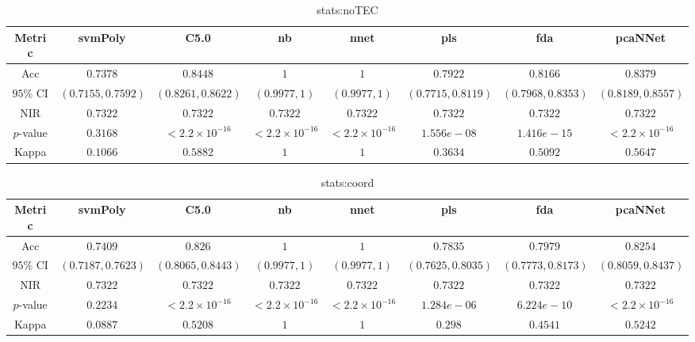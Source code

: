 \begin{table}[!ht]
	\centering
	\begin{tabular}{|c|c|c|c|c|c|c|c|}
		\hline
		Metric & svmPoly & C5.0 & nb & nnet & pls & fda & pcaNNet \\ \hline
		Acc & $0.7378$ & $0.8448$ & $1$ & $1$ & $0.7922$ & $0.8166$ & $0.8379$ \\ \hline
		$95\%$ CI & $(0.7155, 0.7592)$ & $(0.8261, 0.8622)$ & $(0.9977, 1)$ & $(0.9977, 1)$ & $(0.7715, 0.8119)$ & $(0.7968, 0.8353)$ & $(0.8189, 0.8557)$ \\ \hline
		NIR & $0.7322$ & $0.7322$ & $0.7322$ & $0.7322$ & $0.7322$ & $0.7322$ & $0.7322$ \\ \hline
		$p$-value & $0.3168$ & $< 2.2 \times {10}^{-16}$ & $< 2.2 \times {10}^{-16}$ & $< 2.2 \times {10}^{-16}$ & $1.556e-08$ & $1.416e-15$ & $< 2.2 \times {10}^{-16}$ \\ \hline
		Kappa & $0.1066$ & $0.5882$ & $1$ & $1$ & $0.3634$ & $0.5092$ & $0.5647$ \\ \hline
	\end{tabular}
	\caption{stats:noTEC}
	\label{tab:stats:noTEC}
\end{table}

\begin{table}[!ht]
	\centering
	\begin{tabular}{|c|c|c|c|c|c|c|c|}
		\hline
		Metric & svmPoly & C5.0 & nb & nnet & pls & fda & pcaNNet \\ \hline
		Acc & $0.7409$ & $0.826$ & $1$ & $1$ & $0.7835$ & $0.7979$ & $0.8254$ \\ \hline
		$95\%$ CI & $(0.7187, 0.7623)$ & $(0.8065, 0.8443)$ & $(0.9977, 1)$ & $(0.9977, 1)$ & $(0.7625, 0.8035)$ & $(0.7773, 0.8173)$ & $(0.8059, 0.8437)$ \\ \hline
		NIR & $0.7322$ & $0.7322$ & $0.7322$ & $0.7322$ & $0.7322$ & $0.7322$ & $0.7322$ \\ \hline
		$p$-value & $0.2234$ & $< 2.2 \times {10}^{-16}$ & $< 2.2 \times {10}^{-16}$ & $< 2.2 \times {10}^{-16}$ & $1.284e-06$ & $6.224e-10$ & $< 2.2 \times {10}^{-16}$ \\ \hline
		Kappa & $0.0887$ & $0.5208$ & $1$ & $1$ & $0.298$ & $0.4541$ & $0.5242$ \\ \hline
	\end{tabular}
	\caption{stats:coord}
	\label{tab:stats:coord}
\end{table}

